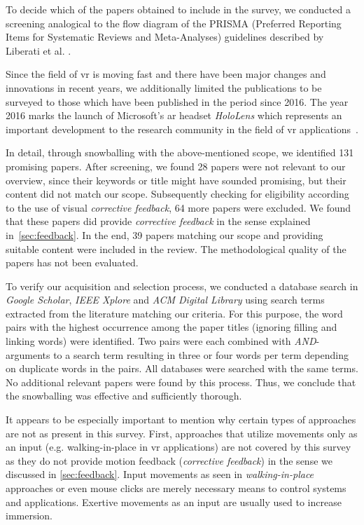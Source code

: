 To decide which of the papers obtained to include in the survey, we conducted a screening analogical to the flow diagram of the PRISMA (Preferred Reporting Items for Systematic Reviews and Meta-Analyses) guidelines described by Liberati et al. \cite{liberati2009prisma}.

Since the field of \acrshort{vr} is moving fast and there have been major changes and innovations in recent years, we additionally limited the publications to be surveyed to those which have been published in the period since 2016. The year 2016 marks the launch of Microsoft's \acrshort{ar} headset \emph{HoloLens} which represents an important development to the research community in the field of \acrshort{vr} applications~\cite{Park2021}.

In detail, through snowballing with the above-mentioned scope, we identified 131 promising papers. After screening, we found 28 papers were not relevant to our overview, since their keywords or title might have sounded promising, but their content did not match our scope. Subsequently checking for eligibility according to the use of visual \emph{corrective feedback}, 64 more papers were excluded. We found that these papers did provide \emph{corrective feedback} in the sense explained in~\autoref{sec:feedback}. In the end, 39 papers matching our scope and providing suitable content were included in the review. The methodological quality of the papers has not been evaluated.

To verify our acquisition and selection process, we conducted a database search in \emph{Google Scholar}, \emph{IEEE Xplore} and \emph{ACM Digital Library} using search terms extracted from the literature matching our criteria. For this purpose, the word pairs with the highest occurrence among the paper titles (ignoring filling and linking words) were identified. Two pairs were each combined with \textit{AND}-arguments to a search term resulting in three or four words per term depending on duplicate words in the pairs. All databases were searched with the same terms. No additional relevant papers were found by this process. Thus, we conclude that the snowballing was effective and sufficiently thorough.

It appears to be especially important to mention why certain types of approaches are not as present in this survey. First, approaches that utilize movements only as an input (e.g. walking-in-place in \acrshort{vr} applications) are not covered by this survey as they do not provide motion feedback (\emph{corrective feedback}) in the sense we discussed in \autoref{sec:feedback}. Input movements as seen in \emph{walking-in-place} approaches or even mouse clicks are merely necessary means to control systems and applications. Exertive movements as an input are usually used to increase immersion. 

